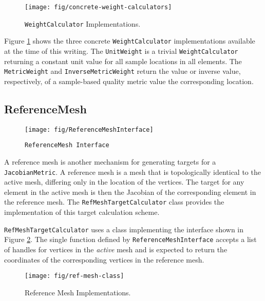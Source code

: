 \documentclass{article}
\begin{document}
\begin{figure}[htb]
\begin{center}
\texttt{[image: fig/concrete-weight-calculators]}
\caption{\texttt{WeightCalculator} Implementations.\label{fig:weight-concrete}}
\end{center}
\end{figure}

Figure \ref{fig:weight-concrete} shows the three concrete \texttt{WeightCalculator} implementations available at the time of this writing.  The \texttt{UnitWeight} is a trivial \texttt{WeightCalculator} returning a constant unit value for all sample locations in all elements.  The \texttt{MetricWeight} and \texttt{InverseMetricWeight} return the value or inverse value, respectively, of a sample-based quality metric value the corresponding location.

\subsection{ReferenceMesh}
\label{sec:RefMesh}

\begin{figure}[htb]
\begin{center}
\texttt{[image: fig/ReferenceMeshInterface]}
\caption{\texttt{ReferenceMesh Interface}\label{fig:refmeshiface}}
\end{center}
\end{figure}

A reference mesh is another mechanism for generating targets for a \texttt{JacobianMetric}.  A reference mesh is a mesh that is topologically identical to the active mesh, differing only in the location of the vertices.  The target for any element in the active mesh is then the Jacobian of the corresponding element in the reference mesh.  The \texttt{RefMeshTargetCalculator} class provides the implementation of this target calculation scheme.  

\texttt{RefMeshTargetCalculator} uses a class implementing the interface shown in Figure \ref{fig:refmeshiface}.  The single function defined by \texttt{ReferenceMeshInterface} accepts a list of handles for vertices in the \emph{active} mesh and is expected to return the coordinates of the corresponding vertices in the reference mesh.

\begin{figure}[htb]
\begin{center}
\texttt{[image: fig/ref-mesh-class]}
\caption{Reference Mesh Implementations.\label{fig:refmesh}}
\end{center}
\end{figure}
\end{document}
